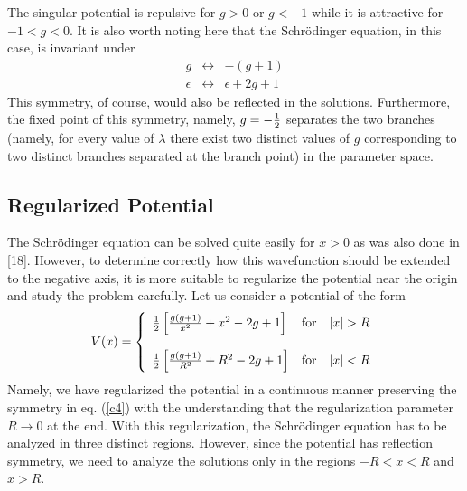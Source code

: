 \documentclass[a4paper,11pt]{article}
\begin{document}
The singular potential is repulsive for $g>0$ or $g<-1$ while it is
attractive for $-1<g<0$. It is also worth noting here that the
Schr\"{o}dinger equation, in this case, is invariant under
\begin{eqnarray}
g & \leftrightarrow & -(g+1)\nonumber\\
\epsilon & \leftrightarrow & \epsilon + 2g + 1\label{c4}
\end{eqnarray}
This symmetry, of course, would also be reflected in the solutions.
Furthermore, 
the fixed point of this symmetry, namely, $g=-{1\over 2}$ separates
the two branches (namely, for every value of $\lambda$ there exist two
distinct values of $g$ corresponding to two distinct branches
separated at the branch point) in the parameter space.

\subsection*{Regularized Potential}

The Schr\"{o}dinger equation  can be solved quite easily
for $x>0$ as was also done in [18]. However, to determine correctly
how this wavefunction should be extended to the negative axis, it is
more suitable to regularize the potential near the origin and study
the problem carefully. Let us consider a potential of the form
\begin{equation}
V(x) = \left\{\begin{array}{lll}
{1\over 2}\left[\frac{g(g+1)}{x^{2}}+x^{2}-2g+1\right] & {\rm for} &
|x|>R\\
 & & \\
{1\over 2}\left[\frac{g(g+1)}{R^{2}}+R^{2}-2g+1\right] & {\rm for} &
|x|<R
\end{array}\right.\label{c5}
\end{equation}
Namely, we have regularized the potential in a continuous manner
preserving the symmetry in eq. (\ref{c4}) with the understanding that
the regularization parameter $R\rightarrow 0$ at the end. With this
regularization, the Schr\"{o}dinger equation has to be analyzed in
three distinct regions. However, since the potential has reflection
symmetry, we need to analyze the solutions only in the regions
$-R<x<R$ and $x>R$.
\end{document}
